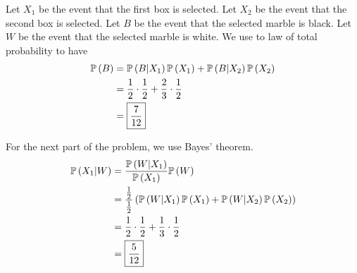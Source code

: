 \documentclass{article}
\begin{document}
\problem{}
Let $X_1$ be the event that the first box is selected.
Let $X_2$ be the event that the second box is selected.
Let $B$ be the event that the selected marble is black.
Let $W$ be the event that the selected marble is white.
We use to law of total probability to have
\begin{align*}
  \mathbb{P} \left ( B \right) &= \mathbb{P} \left ( B \vert X_1 \right) \mathbb{P} \left ( X_1 \right) + \mathbb{P} \left ( B \vert X_2 \right) \mathbb{P} \left ( X_2 \right) \\
         &= \frac{1}{2} \cdot \frac{1}{2} + \frac{2}{3} \cdot \frac{1}{2} \\
         &= \boxed{\frac{7}{12}} \\
\end{align*}

For the next part of the problem, we use Bayes' theorem.
\begin{align*}
  \mathbb{P} \left ( X_1 \vert W \right) &= \frac{\mathbb{P} \left ( W \vert X_1 \right)}{\mathbb{P} \left ( X_1 \right)}  \mathbb{P} \left ( W \right) \\
                   &= \frac{\frac{1}{2}}{\frac{1}{2}} \left (\mathbb{P} \left ( W \vert X_1 \right) \mathbb{P} \left ( X_1 \right) + \mathbb{P} \left ( W \vert X_2 \right) \mathbb{P} \left ( X_2 \right) \right) \\
                   &= \frac{1}{2} \cdot \frac{1}{2} + \frac{1}{3} \cdot \frac{1}{2} \\
                   &= \boxed{\frac{5}{12}} \\
\end{align*}
\end{document}
